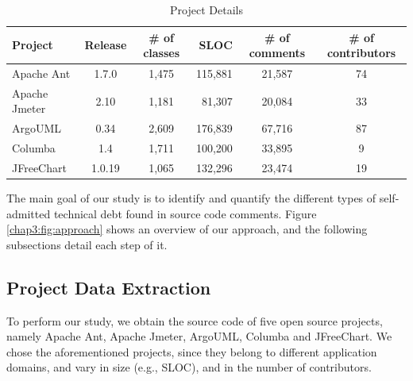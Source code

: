 \begin{table}[!hbt]
      \begin{center}
            \caption{Project Details}
            \label{chap3:tab:project_details}
            \begin{tabular}{l| c c r c c }
            \toprule
            \textbf{Project}   & \textbf{Release}  & \textbf{\# of classes}   & \textbf{SLOC}    & \textbf{\# of comments}  & \textbf{\# of contributors} \\ \midrule 
              Apache Ant       & 1.7.0             &  1,475                   & 115,881          & 21,587                   & 74  \\                       
              Apache Jmeter    & 2.10              &  1,181                   &  81,307          & 20,084                   & 33  \\                         
              ArgoUML          & 0.34              &  2,609                   & 176,839          & 67,716                   & 87  \\               
              Columba          & 1.4               &  1,711                   & 100,200          & 33,895                   & 9   \\                   
              JFreeChart       & 1.0.19            &  1,065                   & 132,296          & 23,474                   & 19  \\ \bottomrule
            \end{tabular}
      \end{center}
\end{table}

The main goal of our study is to identify and quantify the different types of self-admitted technical debt found in source code comments. Figure \ref{chap3:fig:approach} shows an overview of our approach, and the following subsections detail each step of it.

\subsection{Project Data Extraction} 
\label{chap3:sub:project_data_extraction}

To perform our study, we obtain the source code of five open source projects, namely Apache Ant, Apache Jmeter, ArgoUML, Columba and JFreeChart. We chose the aforementioned projects, since they belong to different application domains, and vary in size (e.g., SLOC), and in the number of contributors.

